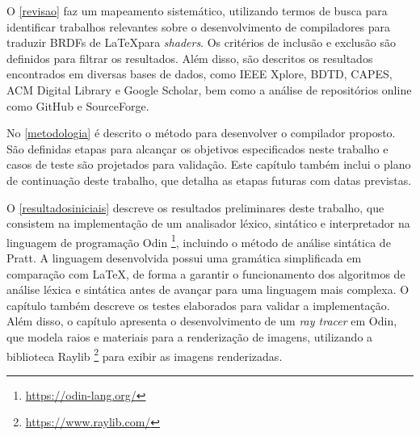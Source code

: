 \documentclass[english, 
               brazil, 
               bsc] %
               {dcomp-abntex2}
\begin{document}
O \autoref{revisao} faz um mapeamento sistemático, utilizando termos de busca para identificar trabalhos relevantes sobre o desenvolvimento de compiladores para traduzir BRDFs de \LaTeX  para \textit{shaders}. Os critérios de inclusão e exclusão são definidos para filtrar os resultados. Além disso, são descritos os resultados encontrados em diversas bases de dados, como IEEE Xplore, BDTD, CAPES, ACM Digital Library e Google Scholar, bem como a análise de repositórios online como GitHub e SourceForge. 

No \autoref{metodologia} é descrito o método para desenvolver o compilador proposto. São definidas etapas para alcançar os objetivos especificados neste trabalho e casos de teste são projetados para validação. Este capítulo também inclui o plano de continuação deste trabalho, que detalha as etapas futuras com datas previstas.


O \autoref{resultadosiniciais} descreve os resultados preliminares deste trabalho, que consistem na implementação de um analisador léxico, sintático e interpretador na linguagem de programação Odin \footnote{\url{https://odin-lang.org/}}, incluindo o método de análise sintática de Pratt. A linguagem desenvolvida possui uma gramática simplificada em comparação com \LaTeX, de forma a garantir o funcionamento dos algoritmos de análise léxica e sintática antes de avançar para uma linguagem mais complexa. O capítulo também descreve os testes elaborados para validar a implementação. Além disso, o capítulo apresenta o desenvolvimento de um \textit{ray tracer} em Odin, que modela raios e materiais para a renderização de imagens, utilizando a biblioteca Raylib \footnote{\url{https://www.raylib.com/}} para exibir as imagens renderizadas.






\end{document}

